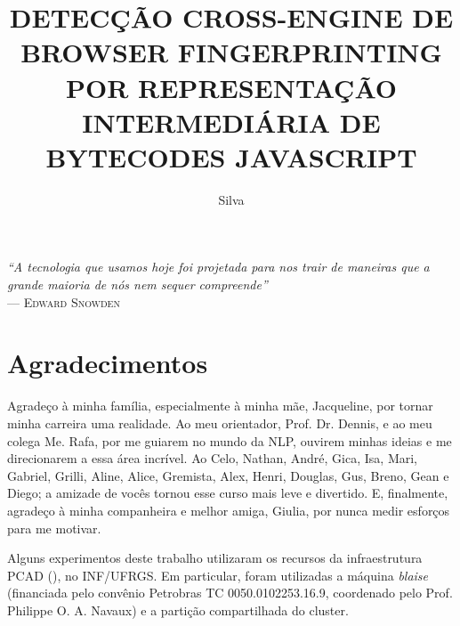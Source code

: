 \documentclass[cic,tc]{iiufrgs}
\title{DETECÇÃO CROSS-ENGINE DE BROWSER FINGERPRINTING POR REPRESENTAÇÃO INTERMEDIÁRIA DE BYTECODES JAVASCRIPT}
\author{Silva}{José Henrique de Souza}
\begin{document}
\maketitle

\clearpage
\begin{flushright}
    \mbox{}\vfill
    {\sffamily\itshape
      ``A tecnologia que usamos hoje foi projetada para nos trair de maneiras que a grande maioria de nós nem sequer compreende''\\}
    --- \textsc{Edward Snowden}
\end{flushright}

\chapter*{Agradecimentos}
Agradeço à minha família, especialmente à minha mãe, Jacqueline, por tornar minha carreira uma realidade. Ao meu orientador, Prof. Dr. Dennis, e ao meu colega Me. Rafa, por me guiarem no mundo da NLP, ouvirem minhas ideias e me direcionarem a essa área incrível. Ao Celo, Nathan, André, Gica, Isa, Mari, Gabriel, Grilli, Aline, Alice, Gremista, Alex, Henri, Douglas, Gus, Breno, Gean e Diego; a amizade de vocês tornou esse curso mais leve e divertido. E, finalmente, agradeço à minha companheira e melhor amiga, Giulia, por nunca medir esforços para me motivar.

Alguns experimentos deste trabalho utilizaram os recursos da infraestrutura PCAD (), no INF/UFRGS. Em particular, foram utilizadas a máquina \textit{blaise} (financiada pelo convênio Petrobras TC 0050.0102253.16.9, coordenado pelo Prof. Philippe O. A. Navaux) e a partição compartilhada do cluster.



\listoffigures
\listoftables
\end{document}
